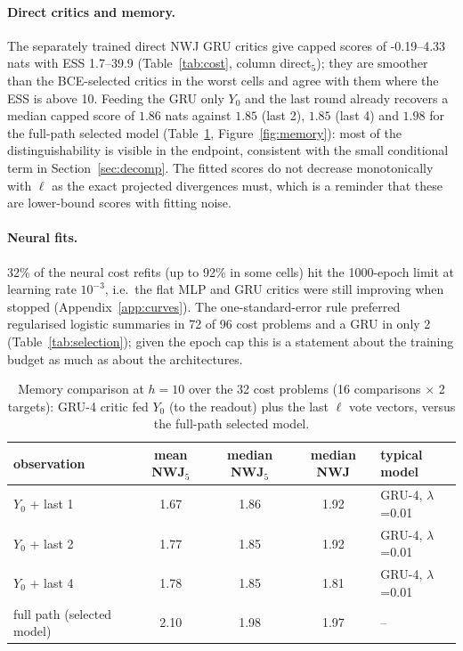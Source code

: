 \documentclass[10pt]{article}
\begin{document}
\paragraph{Direct critics and memory.} The separately trained direct NWJ GRU critics give capped scores of -0.19--4.33 nats with ESS 1.7--39.9 (Table~\ref{tab:cost}, column direct$_5$); they are smoother than the BCE-selected critics in the worst cells and agree with them where the ESS is above 10. Feeding the GRU only $Y_0$ and the last round already recovers a median capped score of $1.86$ nats against $1.85$ (last 2), $1.85$ (last 4) and $1.98$ for the full-path selected model (Table~\ref{tab:memory}, Figure~\ref{fig:memory}): most of the distinguishability is visible in the endpoint, consistent with the small conditional term in Section~\ref{sec:decomp}. The fitted scores do not decrease monotonically with $\ell$ as the exact projected divergences must, which is a reminder that these are lower-bound scores with fitting noise.

\paragraph{Neural fits.} 32\% of the neural cost refits (up to 92\% in some cells) hit the 1000-epoch limit at learning rate $10^{-3}$, i.e.\ the flat MLP and GRU critics were still improving when stopped (Appendix~\ref{app:curves}). The one-standard-error rule preferred regularised logistic summaries in 72 of 96 cost problems and a GRU in only 2 (Table~\ref{tab:selection}); given the epoch cap this is a statement about the training budget as much as about the architectures.

\begin{table}[htbp]
\centering
\small
\caption{Memory comparison at $h=10$ over the 32 cost problems (16 comparisons $\times$ 2 targets): GRU-4 critic fed $Y_0$ (to the readout) plus the last $\ell$ vote vectors, versus the full-path selected model.}\label{tab:memory}
\begin{tabular}{l ccc l}
\toprule
observation & mean NWJ$_5$ & median NWJ$_5$ & median NWJ & typical model \\
\midrule
$Y_0$ + last 1 & 1.67 & 1.86 & 1.92 & GRU-4, $\lambda$=0.01 \\
$Y_0$ + last 2 & 1.77 & 1.85 & 1.92 & GRU-4, $\lambda$=0.01 \\
$Y_0$ + last 4 & 1.78 & 1.85 & 1.81 & GRU-4, $\lambda$=0.01 \\
full path (selected model) & 2.10 & 1.98 & 1.97 & -- \\
\bottomrule
\end{tabular}
\end{table}
\end{document}
